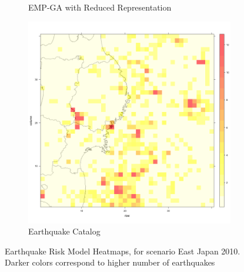\begin{figure}
\begin{subfigure}{.5\textwidth}
  \caption{EMP-GA with Reduced Representation}
  \label{fig:sub3}
\end{subfigure}%
\begin{subfigure}{.5\textwidth}
  \centering
  \includegraphics[width=1\linewidth]{img/realEastJapan_2010}
  \caption{Earthquake Catalog}
  \label{fig:sub4}
\end{subfigure}
\caption{Earthquake Risk Model Heatmaps, for scenario East Japan
  2010. Darker colors correspond to higher number of earthquakes}
\label{fig:test}
\end{figure}

